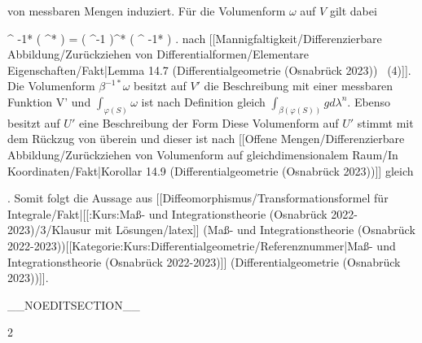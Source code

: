 {von messbaren Mengen induziert. Für die Volumenform $\omega$ auf $V$ gilt dabei

\mavergleichskettedisp
{\vergleichskette
{ \alpha^{ {-1}*} ( \varphi^* \omega)
}
{ =} { \left(  \beta \circ \varphi \circ \alpha^{-1}  \right)^*  ( \beta^{ {-1}*} \omega)
}
{ } {
}
{ } {
}
{ } {
}
}
{}{}{.}
nach
[[Mannigfaltigkeit/Differenzierbare Abbildung/Zurückziehen von Differentialformen/Elementare Eigenschaften/Fakt|Lemma 14.7 (Differentialgeometrie (Osnabrück 2023))  (4)]].
Die Volumenform $\beta^{ {-1}*} \omega$ besitzt auf $V'$ die Beschreibung
 mit einer messbaren Funktion
 {V'} {\R
} {}
und $\int_{\varphi(S)} \omega$ ist nach Definition gleich $\int_{\beta( \varphi(S))} g d \lambda^n$. Ebenso besitzt
 auf $U'$ eine Beschreibung der Form
 Diese Volumenform auf $U'$ stimmt mit dem Rückzug von
 überein und dieser ist nach
[[Offene Mengen/Differenzierbare Abbildung/Zurückziehen von Volumenform auf gleichdimensionalem Raum/In Koordinaten/Fakt|Korollar 14.9 (Differentialgeometrie (Osnabrück 2023))]]
gleich

 {  }

 {} {.}
Somit folgt die Aussage aus
[[Diffeomorphismus/Transformationsformel für Integrale/Fakt|[[:Kurs:Maß- und Integrationstheorie (Osnabrück 2022-2023)/3/Klausur mit Lösungen/latex]] (Maß- und Integrationstheorie (Osnabrück 2022-2023))[[Kategorie:Kurs:Differentialgeometrie/Referenznummer|Maß- und Integrationstheorie (Osnabrück 2022-2023)]] (Differentialgeometrie (Osnabrück 2023))]].

 }

__NOEDITSECTION__

{2}

